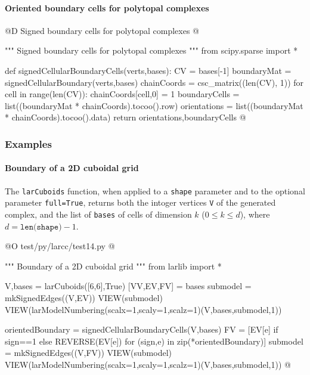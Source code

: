 \documentclass[11pt,oneside]{article}	%
\begin{document}
\paragraph{Oriented boundary cells for polytopal complexes}

@D Signed boundary cells for polytopal complexes
@{""" Signed boundary cells for polytopal complexes """
from scipy.sparse import *

def signedCellularBoundaryCells(verts,bases):
	CV = bases[-1]
	boundaryMat = signedCellularBoundary(verts,bases)
	chainCoords = csc_matrix((len(CV), 1))
	for cell in range(len(CV)): chainCoords[cell,0] = 1
	boundaryCells = list((boundaryMat * chainCoords).tocoo().row)
	orientations = list((boundaryMat * chainCoords).tocoo().data)
	return orientations,boundaryCells
@}

\subsubsection{Examples}

\paragraph{Boundary of a 2D cuboidal grid}
The \texttt{larCuboids} function, when applied to a \texttt{shape} parameter and to the optional parameter \texttt{full=True}, returns both the intoger vertices \texttt{V} of the generated complex, and the list of \texttt{bases} of cells of dimension $k$ ($0\leq k\leq d$), where $d = \texttt{len(shape)}-1$.

@O test/py/larcc/test14.py
@{""" Boundary of a 2D cuboidal grid """
from larlib import *

V,bases = larCuboids([6,6],True)
[VV,EV,FV] = bases
submodel = mkSignedEdges((V,EV))
VIEW(submodel)
VIEW(larModelNumbering(scalx=1,scaly=1,scalz=1)(V,bases,submodel,1))

orientedBoundary = signedCellularBoundaryCells(V,bases)
FV = [EV[e] if sign==1 else REVERSE(EV[e])  for (sign,e) in zip(*orientedBoundary)]
submodel = mkSignedEdges((V,FV))
VIEW(submodel)
VIEW(larModelNumbering(scalx=1,scaly=1,scalz=1)(V,bases,submodel,1))
@}
\end{document}
